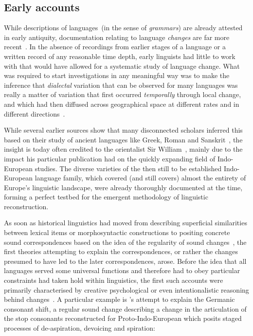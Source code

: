 \subsection{Early accounts}

While descriptions of languages~(in the sense of \emph{grammars}) are already attested in early antiquity, documentation relating to language \emph{changes} are far more recent~\citep[see][ch.I]{Jespersen1922}. In the absence of recordings from earlier stages of a language or a written record of any reasonable time depth, early linguists had little to work with that would have allowed for a systematic study of language change. %
What was required to start investigations in any meaningful way was to make the inference that \emph{dialectal} variation that can be observed for many languages was really a matter of variation that first occurred \emph{temporally} through local change, and which had then diffused across geographical space at different rates and in different directions~\citep{Chambers1998}.

While several earlier sources show that many disconnected scholars inferred this based on their study of ancient languages like Greek, Roman and Sanskrit~\citep[ch.II]{Jespersen1922},
the insight is today often credited to the orientalist Sir William~\citet{Jones1799}, mainly due to the impact his particular publication had on the quickly expanding field of Indo-European studies. The diverse varieties of the then still to be established Indo-European language family, which covered (and still covers) almost the entirety of Europe's linguistic landscape, were already thoroughly documented at the time, forming a perfect testbed for the emergent methodology of linguistic reconstruction.

As soon as historical linguistics had moved from describing superficial similarities between lexical items or morphosyntactic constructions to positing concrete sound correspondences based on the idea of the regularity of sound changes~\citep{Paul1880}, the first theories attempting to explain the correspondences, or rather the changes presumed to have led to the later correspondences, arose. Before the idea that all languages served some universal functions and therefore had to obey particular constraints had taken hold within linguistics, the first such accounts were primarily characterised by creative psychological or even intentionalistic reasoning behind changes~\citep[see also][p.14]{Ross1996}.
A particular example is \citet{Grimm1848}'s attempt to explain the Germanic consonant shift, a regular sound change describing a change in the articulation of the stop consonants reconstructed for Proto-Indo-European which posits staged processes of de-aspiration, devoicing and spiration:

